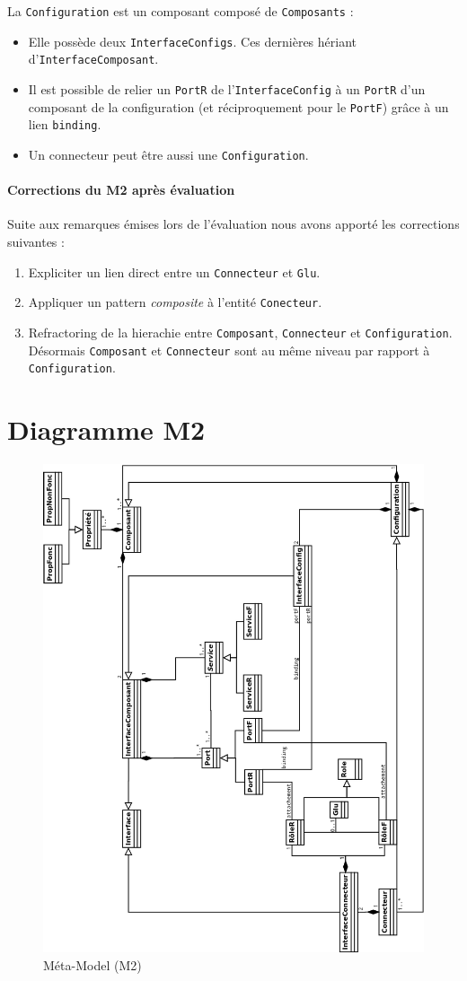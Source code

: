 La \verb+Configuration+  est un composant composé de \verb+Composants+ : 

\begin{itemize}
\item 
  Elle possède deux \verb+InterfaceConfigs+. Ces dernières hériant d'\verb+InterfaceComposant+.
\item
  Il est possible de relier un \verb+PortR+ de l'\verb+InterfaceConfig+ à un \verb+PortR+ d'un composant de la configuration (et réciproquement pour le \verb+PortF+) grâce à un lien \verb+binding+.
\item
  Un connecteur peut être aussi une \verb+Configuration+.
\end{itemize}

\paragraph{Corrections du M2 après évaluation}
Suite aux remarques émises lors de l'évaluation nous avons apporté les corrections suivantes : 
\begin{enumerate}
\item
  Expliciter un lien direct entre un \verb+Connecteur+ et \verb+Glu+.
\item
  Appliquer un pattern \textit{composite} à l'entité \verb+Conecteur+.
\item
  Refractoring de la hierachie entre \verb+Composant+, \verb+Connecteur+ et \verb+Configuration+. Désormais \verb+Composant+ et \verb+Connecteur+ sont au \og même niveau \fg{} par rapport à \verb+Configuration+.
\end{enumerate}

\section{Diagramme M2}
\pagestyle{empty}
\begin{figure}[htb]
  \includegraphics[scale=0.33]{img/M2}
  \caption{Méta-Model (M2)}
  \label{fig:M2}
\end{figure}
